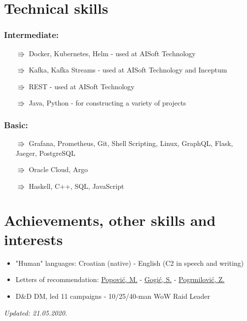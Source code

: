 \documentclass[a4paper]{article}
\newcommand{\bolditalicpair}
[2]
{\textbf{#1} \texorpdfstring{\hfill}{} \textit{#2}}
\begin{document}
\section{Technical skills}
\subsubsection{\bolditalicpair{Intermediate:}{}}

\begin{itemize}
  \item[$\Rrightarrow$] Docker, Kubernetes, Helm - used at AISoft Technology
  \item[$\Rrightarrow$] Kafka, Kafka Streams - used at AISoft Technology and Inceptum
  \item[$\Rrightarrow$] REST - used at AISoft Technology
  \item[$\Rrightarrow$] Java, Python - for constructing a variety of projects
\end{itemize}

\subsubsection{\bolditalicpair{Basic:}{}}

\begin{itemize}
  \item[$\Rrightarrow$] Grafana, Prometheus, Git, Shell Scripting, Linux, GraphQL, Flask, Jaeger, PostgreSQL
  \item[$\Rrightarrow$] Oracle Cloud, Argo
  \item[$\Rrightarrow$] Haskell, C++, SQL, JavaScript
\end{itemize}



\section{Achievements, other skills and interests}

\begin{itemize}
  \item "Human" languages: Croatian (native) - English (C2 in speech and writing)
  \item Letters of recommendation: \href{https://github.com/MislavJaksic/CV/blob/master/LoR/AISoft_Popovic.pdf}{Popović, M.} - \href{https://github.com/MislavJaksic/CV/blob/master/LoR/Atos_Gogic.pdf}{Gogić, S.} - \href{https://github.com/MislavJaksic/CV/blob/master/LoR/Atos_Pogrmilovic.pdf}{Pogrmilović, Z.}
  \item D\&D DM, led 11 campaigns - 10/25/40-man WoW Raid Leader
\end{itemize}

\bolditalicpair{}{Updated: 21.05.2020.}
\end{document}
